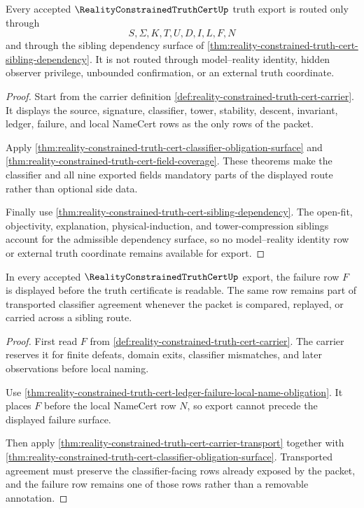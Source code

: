 \begin{theorem}
\label{thm:reality-constrained-truth-cert-kernel-truth-route}
Every accepted $\RealityConstrainedTruthCertUp$ truth export is routed only through
$$
S,\Sigma,K,T,U,D,I,L,F,N
$$
and through the sibling dependency surface of \autoref{thm:reality-constrained-truth-cert-sibling-dependency}. It is not routed through model--reality identity, hidden observer privilege, unbounded confirmation, or an external truth coordinate.
\end{theorem}
\begin{proof}
Start from the carrier definition \autoref{def:reality-constrained-truth-cert-carrier}. It displays the source, signature, classifier, tower, stability, descent, invariant, ledger, failure, and local NameCert rows as the only rows of the packet.

Apply \autoref{thm:reality-constrained-truth-cert-classifier-obligation-surface} and \autoref{thm:reality-constrained-truth-cert-field-coverage}. These theorems make the classifier and all nine exported fields mandatory parts of the displayed route rather than optional side data.

Finally use \autoref{thm:reality-constrained-truth-cert-sibling-dependency}. The open-fit, objectivity, explanation, physical-induction, and tower-compression siblings account for the admissible dependency surface, so no model--reality identity row or external truth coordinate remains available for export.
\end{proof}

\begin{theorem}
\label{thm:reality-constrained-truth-cert-failure-readiness}
In every accepted $\RealityConstrainedTruthCertUp$ export, the failure row $F$ is displayed before the truth certificate is readable. The same row remains part of transported classifier agreement whenever the packet is compared, replayed, or carried across a sibling route.
\end{theorem}
\begin{proof}
First read $F$ from \autoref{def:reality-constrained-truth-cert-carrier}. The carrier reserves it for finite defeats, domain exits, classifier mismatches, and later observations before local naming.

Use \autoref{thm:reality-constrained-truth-cert-ledger-failure-local-name-obligation}. It places $F$ before the local NameCert row $N$, so export cannot precede the displayed failure surface.

Then apply \autoref{thm:reality-constrained-truth-cert-carrier-transport} together with \autoref{thm:reality-constrained-truth-cert-classifier-obligation-surface}. Transported agreement must preserve the classifier-facing rows already exposed by the packet, and the failure row remains one of those rows rather than a removable annotation.
\end{proof}

